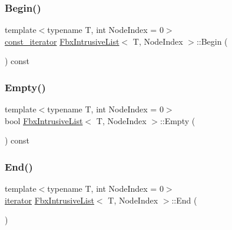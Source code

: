 \mbox{\label{class_fbx_intrusive_list_a6d61be38f14d516be3d5a9e008b95376}} 
\subsubsection{\texorpdfstring{Begin()}{Begin()}\hspace{0.1cm}{\footnotesize\ttfamily [2/2]}}
{\footnotesize\ttfamily template$<$typename T, int Node\+Index = 0$>$ \\
\hyperlink{class_fbx_intrusive_list_a4c0c567c56a712e7ffca9c6bb5990169}{const\+\_\+iterator} \hyperlink{class_fbx_intrusive_list}{Fbx\+Intrusive\+List}$<$ T, Node\+Index $>$\+::Begin (\begin{DoxyParamCaption}{ }\end{DoxyParamCaption}) const}

\mbox{\label{class_fbx_intrusive_list_aa2dc68e4cac0bb5ac2e715e3d9d30ef0}} 
\subsubsection{\texorpdfstring{Empty()}{Empty()}}
{\footnotesize\ttfamily template$<$typename T, int Node\+Index = 0$>$ \\
bool \hyperlink{class_fbx_intrusive_list}{Fbx\+Intrusive\+List}$<$ T, Node\+Index $>$\+::Empty (\begin{DoxyParamCaption}{ }\end{DoxyParamCaption}) const}

\mbox{\label{class_fbx_intrusive_list_aca923b70771ffd74088c8cfc0b70f3da}} 
\subsubsection{\texorpdfstring{End()}{End()}\hspace{0.1cm}{\footnotesize\ttfamily [1/2]}}
{\footnotesize\ttfamily template$<$typename T, int Node\+Index = 0$>$ \\
\hyperlink{class_fbx_intrusive_list_ae1012cd86e3ff0a4a49c982f0d34b4e7}{iterator} \hyperlink{class_fbx_intrusive_list}{Fbx\+Intrusive\+List}$<$ T, Node\+Index $>$\+::End (\begin{DoxyParamCaption}{ }\end{DoxyParamCaption})}

